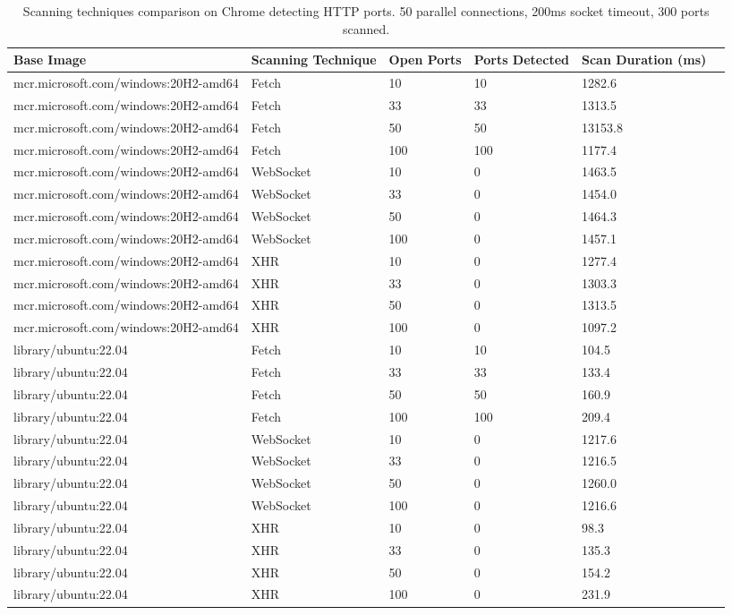 \begin{table}[htbp]
    \footnotesize
    \centering
    \begin{tabular}{p{6.3cm}p{1.5cm}p{1.7cm}p{1.7cm}p{2.2cm}p{3cm}}
        \toprule
        Base Image & Scanning Technique & Open Ports & Ports Detected & Scan Duration (ms) \\
        \midrule
        mcr.microsoft.com/windows:20H2-amd64 & Fetch & 10 & 10 & 1282.6 \\
        mcr.microsoft.com/windows:20H2-amd64 & Fetch & 33 & 33 & 1313.5 \\
        mcr.microsoft.com/windows:20H2-amd64 & Fetch & 50 & 50 & 13153.8 \\
        mcr.microsoft.com/windows:20H2-amd64 & Fetch & 100 & 100 & 1177.4 \\
        \midrule
        mcr.microsoft.com/windows:20H2-amd64 & WebSocket & 10 & 0 & 1463.5 \\
        mcr.microsoft.com/windows:20H2-amd64 & WebSocket & 33 & 0 & 1454.0 \\
        mcr.microsoft.com/windows:20H2-amd64 & WebSocket & 50 & 0 & 1464.3 \\
        mcr.microsoft.com/windows:20H2-amd64 & WebSocket & 100 & 0 & 1457.1 \\
        \midrule
        mcr.microsoft.com/windows:20H2-amd64 & XHR & 10 & 0 & 1277.4 \\
        mcr.microsoft.com/windows:20H2-amd64 & XHR & 33 & 0 & 1303.3 \\
        mcr.microsoft.com/windows:20H2-amd64 & XHR & 50 & 0 & 1313.5 \\
        mcr.microsoft.com/windows:20H2-amd64 & XHR & 100 & 0 & 1097.2 \\
        \midrule
        library/ubuntu:22.04 & Fetch & 10 & 10 & 104.5 \\
        library/ubuntu:22.04 & Fetch & 33 & 33 & 133.4 \\
        library/ubuntu:22.04 & Fetch & 50 & 50 & 160.9 \\
        library/ubuntu:22.04 & Fetch & 100 & 100 & 209.4 \\
        \midrule
        library/ubuntu:22.04 & WebSocket & 10 & 0 & 1217.6 \\
        library/ubuntu:22.04 & WebSocket & 33 & 0 & 1216.5 \\
        library/ubuntu:22.04 & WebSocket & 50 & 0 & 1260.0 \\
        library/ubuntu:22.04 & WebSocket & 100 & 0 & 1216.6 \\
        \midrule
        library/ubuntu:22.04 & XHR & 10 & 0 & 98.3 \\
        library/ubuntu:22.04 & XHR & 33 & 0 & 135.3 \\
        library/ubuntu:22.04 & XHR & 50 & 0 & 154.2 \\
        library/ubuntu:22.04 & XHR & 100 & 0 & 231.9 \\
        \bottomrule
    \end{tabular}
    \caption{Scanning techniques comparison on Chrome detecting HTTP ports. 50 parallel connections, 200ms socket timeout, 300 ports scanned.}
    \label{tab:scan-technique-comparison-chrome}
\end{table}

